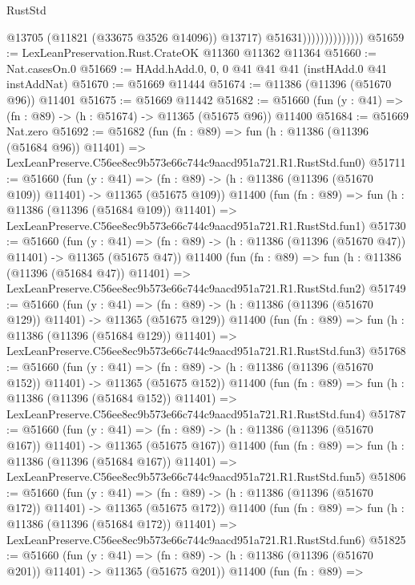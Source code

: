 \begin{lexlean}{RustStd}
\begin{coremodule}
                                  @13705
                                  (@11821 (@33675 @3526 @14096))
                                  @13717)
                                @51631))))))))))))))
@51659 := LexLeanPreservation.Rust.CrateOK @11360 @11362 @11364
@51660 := Nat.casesOn.{0}
@51669 := HAdd.hAdd.{0, 0, 0} @41 @41 @41 (instHAdd.{0} @41 instAddNat)
@51670 := @51669 @11444
@51674 := @11386 (@11396 (@51670 @96)) @11401
@51675 := @51669 @11442
@51682 := @51660 (fun (y : @41) => (fn : @89) -> (h : @51674) -> @11365 (@51675 @96)) @11400
@51684 := @51669 Nat.zero
@51692 := @51682
    (fun (fn : @89) =>
    fun (h : @11386 (@11396 (@51684 @96)) @11401) =>
    LexLeanPreserve.C56ee8ec9b573e66c744c9aacd951a721.R1.RustStd.fun0)
@51711 := @51660
    (fun (y : @41) =>
    (fn : @89) -> (h : @11386 (@11396 (@51670 @109)) @11401) -> @11365 (@51675 @109))
    @11400
    (fun (fn : @89) =>
    fun (h : @11386 (@11396 (@51684 @109)) @11401) =>
    LexLeanPreserve.C56ee8ec9b573e66c744c9aacd951a721.R1.RustStd.fun1)
@51730 := @51660
    (fun (y : @41) =>
    (fn : @89) -> (h : @11386 (@11396 (@51670 @47)) @11401) -> @11365 (@51675 @47))
    @11400
    (fun (fn : @89) =>
    fun (h : @11386 (@11396 (@51684 @47)) @11401) =>
    LexLeanPreserve.C56ee8ec9b573e66c744c9aacd951a721.R1.RustStd.fun2)
@51749 := @51660
    (fun (y : @41) =>
    (fn : @89) -> (h : @11386 (@11396 (@51670 @129)) @11401) -> @11365 (@51675 @129))
    @11400
    (fun (fn : @89) =>
    fun (h : @11386 (@11396 (@51684 @129)) @11401) =>
    LexLeanPreserve.C56ee8ec9b573e66c744c9aacd951a721.R1.RustStd.fun3)
@51768 := @51660
    (fun (y : @41) =>
    (fn : @89) -> (h : @11386 (@11396 (@51670 @152)) @11401) -> @11365 (@51675 @152))
    @11400
    (fun (fn : @89) =>
    fun (h : @11386 (@11396 (@51684 @152)) @11401) =>
    LexLeanPreserve.C56ee8ec9b573e66c744c9aacd951a721.R1.RustStd.fun4)
@51787 := @51660
    (fun (y : @41) =>
    (fn : @89) -> (h : @11386 (@11396 (@51670 @167)) @11401) -> @11365 (@51675 @167))
    @11400
    (fun (fn : @89) =>
    fun (h : @11386 (@11396 (@51684 @167)) @11401) =>
    LexLeanPreserve.C56ee8ec9b573e66c744c9aacd951a721.R1.RustStd.fun5)
@51806 := @51660
    (fun (y : @41) =>
    (fn : @89) -> (h : @11386 (@11396 (@51670 @172)) @11401) -> @11365 (@51675 @172))
    @11400
    (fun (fn : @89) =>
    fun (h : @11386 (@11396 (@51684 @172)) @11401) =>
    LexLeanPreserve.C56ee8ec9b573e66c744c9aacd951a721.R1.RustStd.fun6)
@51825 := @51660
    (fun (y : @41) =>
    (fn : @89) -> (h : @11386 (@11396 (@51670 @201)) @11401) -> @11365 (@51675 @201))
    @11400
    (fun (fn : @89) =>

\end{coremodule}
\end{lexlean}
